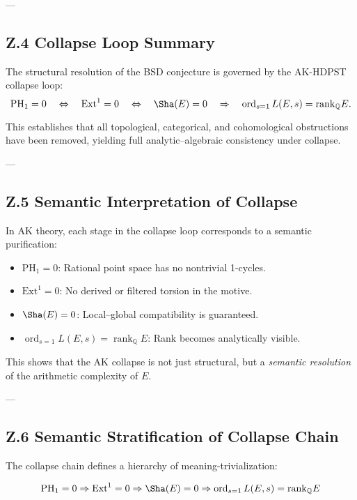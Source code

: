 ---

\subsection*{Z.4 Collapse Loop Summary}

The structural resolution of the BSD conjecture is governed by the AK-HDPST collapse loop:
\[
\mathrm{PH}_1 = 0 
\quad \Leftrightarrow \quad \mathrm{Ext}^1 = 0 
\quad \Leftrightarrow \quad \Sha(E) = 0 
\quad \Rightarrow \quad \operatorname{ord}_{s=1} L(E,s) = \mathrm{rank}_\mathbb{Q} E.
\]

This establishes that all topological, categorical, and cohomological obstructions have been removed,  
yielding full analytic–algebraic consistency under collapse.

---

\subsection*{Z.5 Semantic Interpretation of Collapse}

In AK theory, each stage in the collapse loop corresponds to a semantic purification:

\begin{itemize}
  \item \( \mathrm{PH}_1 = 0 \): Rational point space has no nontrivial 1-cycles.
  \item \( \mathrm{Ext}^1 = 0 \): No derived or filtered torsion in the motive.
  \item \( \Sha(E) = 0 \): Local–global compatibility is guaranteed.
  \item \( \operatorname{ord}_{s=1} L(E,s) = \operatorname{rank}_\mathbb{Q} E \): Rank becomes analytically visible.
\end{itemize}

This shows that the AK collapse is not just structural,  
but a \textit{semantic resolution} of the arithmetic complexity of \( E \).

---

\subsection*{Z.6 Semantic Stratification of Collapse Chain}

The collapse chain defines a hierarchy of meaning-trivialization:

\[
\mathrm{PH}_1 = 0 \Rightarrow \mathrm{Ext}^1 = 0 \Rightarrow \Sha(E) = 0 \Rightarrow \operatorname{ord}_{s=1} L(E,s) = \mathrm{rank}_\mathbb{Q} E
\]


